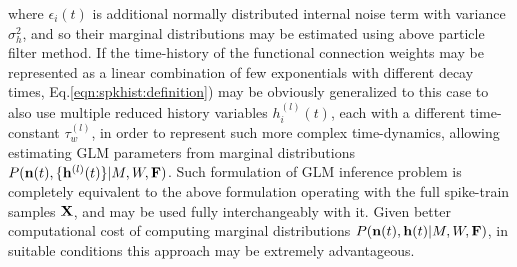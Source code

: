 where $\epsilon_i(t)$ is additional normally distributed internal noise term with variance $\sigma^2_h$, and so their marginal distributions may be estimated using above particle filter method. If the time-history of the  functional connection weights may be represented as a linear combination of few exponentials with different decay times, Eq.\eqref{eqn:spkhist:definition}) may be obviously generalized to this case to also use multiple reduced history variables $h_i^{(l)}(t)$, each with a different time-constant $\tau^{(l)}_w$, in order to represent such more complex time-dynamics, allowing estimating GLM parameters from marginal distributions $P({\bf n}(t), \{{\bf h}^{(l)}(t)\}|M, W, {\bf F})$.  Such formulation of GLM inference problem is completely equivalent to the above formulation operating with the full spike-train samples ${\bf X}$, and may be used fully interchangeably with it. Given better computational cost of computing marginal distributions $P({\bf n}(t), {\bf h}(t)|M, W, {\bf F})$, in suitable conditions this approach may be extremely advantageous.